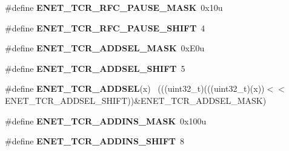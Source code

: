 \begin{DoxyCompactItemize}
\item 
\hypertarget{group___e_n_e_t___register___masks_ga58df374de0ed871ab2ca078de9dbea40}{}\#define {\bfseries E\+N\+E\+T\+\_\+\+T\+C\+R\+\_\+\+R\+F\+C\+\_\+\+P\+A\+U\+S\+E\+\_\+\+M\+A\+S\+K}~0x10u\label{group___e_n_e_t___register___masks_ga58df374de0ed871ab2ca078de9dbea40}

\item 
\hypertarget{group___e_n_e_t___register___masks_ga78f8c9e05c33991ec790011804fee80d}{}\#define {\bfseries E\+N\+E\+T\+\_\+\+T\+C\+R\+\_\+\+R\+F\+C\+\_\+\+P\+A\+U\+S\+E\+\_\+\+S\+H\+I\+F\+T}~4\label{group___e_n_e_t___register___masks_ga78f8c9e05c33991ec790011804fee80d}

\item 
\hypertarget{group___e_n_e_t___register___masks_ga3bfa977a883b14b1f86c879e0a31ef5b}{}\#define {\bfseries E\+N\+E\+T\+\_\+\+T\+C\+R\+\_\+\+A\+D\+D\+S\+E\+L\+\_\+\+M\+A\+S\+K}~0x\+E0u\label{group___e_n_e_t___register___masks_ga3bfa977a883b14b1f86c879e0a31ef5b}

\item 
\hypertarget{group___e_n_e_t___register___masks_ga1916110879ce7cd7c03a5aa919a26914}{}\#define {\bfseries E\+N\+E\+T\+\_\+\+T\+C\+R\+\_\+\+A\+D\+D\+S\+E\+L\+\_\+\+S\+H\+I\+F\+T}~5\label{group___e_n_e_t___register___masks_ga1916110879ce7cd7c03a5aa919a26914}

\item 
\hypertarget{group___e_n_e_t___register___masks_ga51ddb73a3d9ee3ddec668ffb0e7f3b32}{}\#define {\bfseries E\+N\+E\+T\+\_\+\+T\+C\+R\+\_\+\+A\+D\+D\+S\+E\+L}(x)                                          ~(((uint32\+\_\+t)(((uint32\+\_\+t)(x))$<$$<$E\+N\+E\+T\+\_\+\+T\+C\+R\+\_\+\+A\+D\+D\+S\+E\+L\+\_\+\+S\+H\+I\+F\+T))\&E\+N\+E\+T\+\_\+\+T\+C\+R\+\_\+\+A\+D\+D\+S\+E\+L\+\_\+\+M\+A\+S\+K)\label{group___e_n_e_t___register___masks_ga51ddb73a3d9ee3ddec668ffb0e7f3b32}

\item 
\hypertarget{group___e_n_e_t___register___masks_gaeb5338e8af454ab3ef6c6941db06157b}{}\#define {\bfseries E\+N\+E\+T\+\_\+\+T\+C\+R\+\_\+\+A\+D\+D\+I\+N\+S\+\_\+\+M\+A\+S\+K}~0x100u\label{group___e_n_e_t___register___masks_gaeb5338e8af454ab3ef6c6941db06157b}

\item 
\hypertarget{group___e_n_e_t___register___masks_ga0cecb548325189373066c8844f4d9bc4}{}\#define {\bfseries E\+N\+E\+T\+\_\+\+T\+C\+R\+\_\+\+A\+D\+D\+I\+N\+S\+\_\+\+S\+H\+I\+F\+T}~8\label{group___e_n_e_t___register___masks_ga0cecb548325189373066c8844f4d9bc4}


\end{DoxyCompactItemize}
